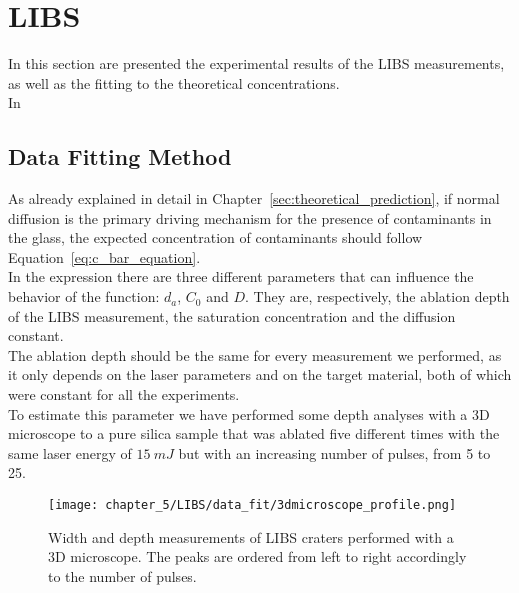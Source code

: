 \section{LIBS}
\label{sec:LIBS_measurements}

In this section are presented the experimental results of the LIBS measurements, as well as the fitting to the theoretical concentrations.
\\
In 

\subsection{Data Fitting Method}
\label{subsec:data_fitting}
As already explained in detail in Chapter~\ref{sec:theoretical_prediction}, if normal diffusion is the primary driving mechanism for the presence of contaminants in the glass, the expected concentration of contaminants should follow Equation~\ref{eq:c_bar_equation}.
\\
In the expression there are three different parameters that can influence the behavior of the function: $d_a$, $C_0$ and $D$. They are, respectively, the ablation depth of the LIBS measurement, the saturation concentration and the diffusion constant.
\\
The ablation depth should be the same for every measurement we performed, as it only depends on the laser parameters and on the target material, both of which were constant for all the experiments.
\\
To estimate this parameter we have performed some depth analyses with a 3D microscope to a pure silica sample that was ablated five different times with the same laser energy of $15 \: mJ$ but with an increasing number of pulses, from 5 to 25.

\begin{figure}[H]
    \centering
    \texttt{[image: chapter\_5/LIBS/data\_fit/3dmicroscope\_profile.png]} 
    \caption{Width and depth measurements of LIBS craters performed with a 3D microscope. The peaks are ordered from left to right accordingly to the number of pulses.}
    \label{fig:3d_microscope_craters}
 \end{figure}

